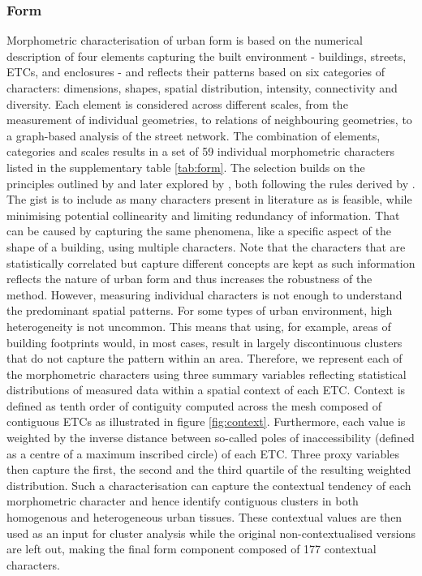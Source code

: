 \documentclass[fleqn,10pt]{wlscirep}
\begin{document}
\subsubsection*{Form}
Morphometric characterisation of urban form is based on the numerical description
of four elements capturing the built environment - buildings, streets, ETCs, and
enclosures - and reflects their patterns based on six categories of
characters: dimensions, shapes, spatial
distribution, intensity, connectivity and diversity\cite{fleischmann2020a}. Each element is considered across
different scales, from the measurement of individual geometries, to relations of
neighbouring geometries, to a graph-based analysis of the street network. The combination of
elements, categories and scales results in a set of 59 individual morphometric
characters listed in the supplementary table \ref{tab:form}. The selection builds on the principles
outlined by \cite{dibble2019origin} and later explored by \cite{fleischmann2021}, both
following the rules derived by \cite{sneath1973numerical}. The gist is to include as
many characters present in literature as is feasible, while minimising potential
collinearity and limiting redundancy of information. That can be caused by capturing the same
phenomena, like a specific aspect of the shape of a building, using multiple characters. Note that
the characters that are statistically correlated but capture different concepts are kept as such
information reflects the nature of urban form and thus increases the robustness of the method.
However, measuring individual characters is not enough to understand the predominant
spatial patterns. For some types of urban environment, high heterogeneity is not
uncommon. This means that using, for example, areas of building footprints would, in most cases, result
in largely discontinuous clusters that do not capture the pattern within an area. Therefore, we represent each of the
morphometric characters using three summary variables reflecting statistical distributions
of measured data within a spatial context of each ETC. Context is defined as
tenth
order of contiguity computed across the mesh composed of contiguous ETCs as illustrated
in figure \ref{fig:context}. Furthermore, each
value is weighted by the inverse distance between so-called poles of inaccessibility
(defined as a centre of a maximum inscribed circle) of each ETC. Three proxy variables
then capture the first, the second and the third quartile of the resulting weighted
distribution. Such a characterisation can capture the contextual tendency of each
morphometric character and hence identify contiguous clusters in both homogenous and
heterogeneous urban tissues. These contextual values are then used as an input for
cluster analysis while the original non-contextualised versions are left out, making the
final form component composed of 177 contextual characters.
\end{document}
